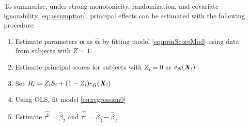 \documentclass{statsoc} %
\begin{document}
To summarize, under strong monotonicity, randomization, and covariate ignorability \eqref{eq:assumption}, principal effects can be estimated with the following procedure:
\begin{enumerate}
\item Estimate parameters $\bm{\alpha}$ as $\bm{\hat{\alpha}}$ by fitting model \eqref{eq:prinScoreMod} using data from subjects with $Z=1$.
\item Estimate principal scores for subjects with $Z_i=0$ as $e_{\bm{\hat{\alpha}}}(\bm{X}_i)$
\item Set $R_i=Z_iS_i+(1-Z_i)e_{\bm{\hat{\alpha}}}(\bm{X}_i)$
\item Using OLS, fit model \eqref{eq:regression0}
\item Estimate $\hat{\tau^0}=\hat{\beta}_2$ and $\hat{\tau^1}=\hat{\beta}_3-\hat{\beta}_2$
\end{enumerate}
\end{document}
